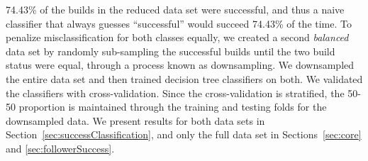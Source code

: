 \documentclass[10pt, conference]{IEEEtran}
\begin{document}
74.43\% of the builds in the reduced data set were successful, and thus a naive
classifier that always guesses ``successful'' would succeed 74.43\% of the time.
To penalize misclassification for
both classes equally, we created a second \emph{balanced} data set by randomly 
sub-sampling the successful builds until the two build status were
equal, through a process known as downsampling. We downsampled the entire
data set and then trained decision tree classifiers on both.  We validated the
classifiers with cross-validation. Since the cross-validation is stratified, the
50-50 proportion is maintained through the training and testing folds for the
downsampled data. We present results for both
data sets in Section~\ref{sec:successClassification},  and only the full data 
set in Sections~\ref{sec:core} and \ref{sec:followerSuccess}.
\end{document}

